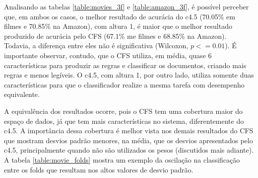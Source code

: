 \documentclass[template.tex]{subfiles}
\begin{document}
Analisando as tabelas \ref{table:movies_3f} e \ref{table:amazon_3f}, é possível perceber que, em ambos os casos, o melhor resultado de acurácia do c4.5 (70.05\% em filmes e 70.85\% na Amazon), com altura 1, é maior que o melhor resultado produzido de acurácia pelo CFS (67.1\% me filmes e 68.85\% na Amazon). Todavia, a diferença entre eles não é significativa (Wilcoxon, $p<=0.01$). É importante observar, contudo, que o CFS utiliza, em média, quase 6 características para produzir as regras e classificar os documentos, criando mais regras e menos legíveis. O c4.5, com altura 1, por outro lado, utiliza somente duas características para que o classificador realize a mesma tarefa com desempenho equivalente. 

A equivalência dos resultados ocorre, pois o CFS tem uma cobertura maior do espaço de dados, já que tem mais características no sistema, diferentemente do c4.5. A importância dessa cobertura é melhor vista nos demais resultados do CFS que mostram desvios padrão menores,  na média, que os desvios apresentados pelo c4.5, principalmente quando não são utilizados os pesos (discutidos mais adiante). A tabela \ref{table:movie_folds} mostra um exemplo da oscilação na classificação entre os folds que resultam nos altos valores de desvio padrão.
\end{document}
